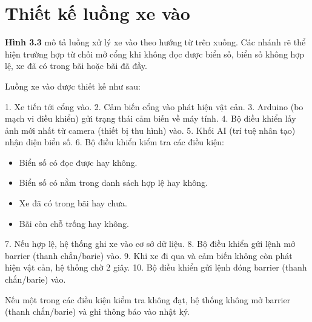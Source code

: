 \documentclass[a4paper,14pt]{extreport}
\begin{document}
\section{Thiết kế luồng xe vào}

\textbf{Hình 3.3} mô tả luồng xử lý xe vào theo hướng từ trên xuống. Các nhánh rẽ thể hiện trường hợp từ chối mở cổng khi không đọc được biển số, biển số không hợp lệ, xe đã có trong bãi hoặc bãi đã đầy.

Luồng xe vào được thiết kế như sau:

1. Xe tiến tới cổng vào.
2. Cảm biến cổng vào phát hiện vật cản.
3. Arduino (bo mạch vi điều khiển) gửi trạng thái cảm biến về máy tính.
4. Bộ điều khiển lấy ảnh mới nhất từ camera (thiết bị thu hình) vào.
5. Khối AI (trí tuệ nhân tạo) nhận diện biển số.
6. Bộ điều khiển kiểm tra các điều kiện:
\begin{itemize}[leftmargin=2em]
  \item Biển số có đọc được hay không.
  \item Biển số có nằm trong danh sách hợp lệ hay không.
  \item Xe đã có trong bãi hay chưa.
  \item Bãi còn chỗ trống hay không.
\end{itemize}
7. Nếu hợp lệ, hệ thống ghi xe vào cơ sở dữ liệu.
8. Bộ điều khiển gửi lệnh mở barrier (thanh chắn/barie) vào.
9. Khi xe đi qua và cảm biến không còn phát hiện vật cản, hệ thống chờ 2 giây.
10. Bộ điều khiển gửi lệnh đóng barrier (thanh chắn/barie) vào.

Nếu một trong các điều kiện kiểm tra không đạt, hệ thống không mở barrier (thanh chắn/barie) và ghi thông báo vào nhật ký.
\end{document}
